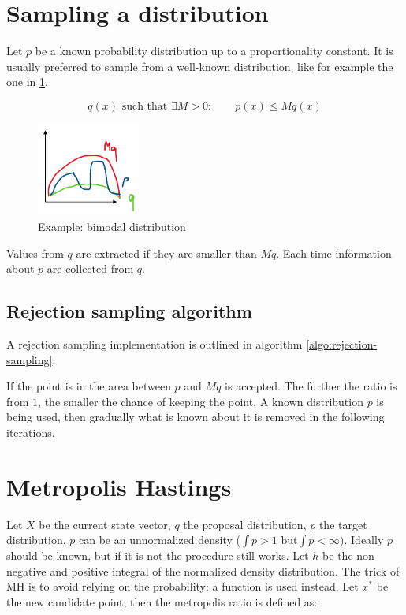 \section{Sampling a distribution}
Let $p$ be a known probability distribution up to a proportionality constant.
It is usually preferred to sample from a well-known distribution, like for example the one in \ref{fig:bimodal}.

$$q(x)\text{ such that }\exists M>0: \qquad p(x) \leq M q(x)$$


\begin{figure}[H]
  \centering
  \includegraphics[width=0.3\textwidth]{distribution.png}
  \caption{Example: bimodal distribution}
  \label{fig:bimodal}
\end{figure}

Values from $q$ are extracted if they are smaller than $Mq$.
Each time information about $p$ are collected from $q$.

  \subsection{Rejection sampling algorithm}
  A rejection sampling implementation is outlined in algorithm \ref{algo:rejection-sampling}.

  

  If the point is in the area between $p$ and $Mq$ is accepted.
  The further the ratio is from $1$, the smaller the chance of keeping the point.
  A known distribution $p$ is being used, then gradually what is known about it is removed in the following iterations.

\section{Metropolis Hastings}
Let $X$ be the current state vector, $q$ the proposal distribution, $p$ the target distribution.
$p$ can be an unnormalized density ($\int p > 1 \text{ but} \int p < \infty)$.
Ideally $p$ should be known, but if it is not the procedure still works.
Let $h$ be the non negative and positive integral of the normalized density distribution.
The trick of MH is to avoid relying on the probability: a function is used instead.
Let $x^*$ be the new candidate point, then the metropolis ratio is defined as:

